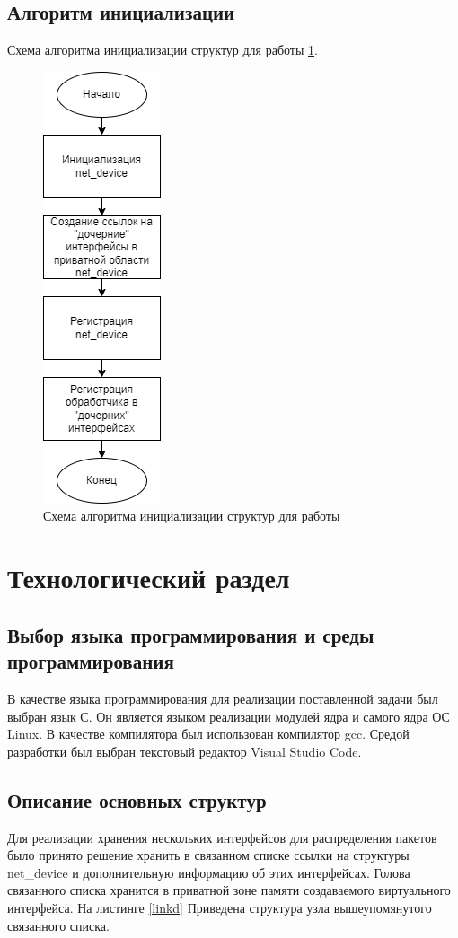 \documentclass[14pt, a4paper]{extarticle}
\begin{document}
\subsection{Алгоритм инициализации }
\indent Схема алгоритма инициализации структур для работы \ref{gen}.
\begin{figure}[H]
	\centering
	\includegraphics[scale=0.9]{gen.png}
	\caption{Схема алгоритма инициализации структур для работы}
	\label{gen}
\end{figure}

\clearpage
\section{Технологический раздел}
\subsection{Выбор языка программирования и среды программирования}
В качестве языка программирования для реализации поставленной
задачи был выбран язык С. Он является языком реализации модулей ядра и самого ядра ОС Linux. В качестве компилятора был использован
компилятор gcc. Средой разработки был выбран текстовый редактор Visual Studio Code.

\subsection{Описание основных структур}
Для реализации хранения нескольких интерфейсов для распределения пакетов было принято решение хранить в связанном списке ссылки на структуры net\_device и дополнительную информацию об этих интерфейсах. Голова связанного списка хранится в приватной зоне памяти создаваемого виртуального интерфейса. На листинге \ref{linkd} Приведена структура узла вышеупомянутого связанного списка.
\end{document}
